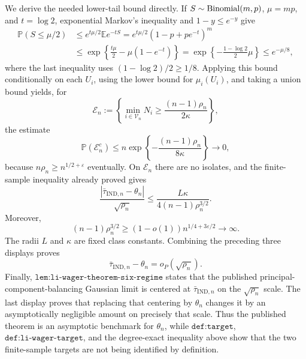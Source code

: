 We derive the needed lower-tail bound directly.  If \(S\sim{\rm Binomial}(m,p)\), \(\mu=mp\), and \(t=\log2\), exponential Markov's inequality and \(1-y\le e^{-y}\) give
\[
\begin{aligned}
\mathbb P(S\le\mu/2)
&\le e^{t\mu/2}\mathbb E e^{-tS}
=e^{t\mu/2}(1-p+pe^{-t})^m\\
&\le\exp\!\left\{\frac{t\mu}{2}-\mu(1-e^{-t})\right\}
=\exp\!\left\{-\frac{1-\log2}{2}\mu\right\}
\le e^{-\mu/8},
\end{aligned}
\]
where the last inequality uses \((1-\log2)/2\ge1/8\).  Applying this bound conditionally on each \(U_i\), using the lower bound for \(\mu_i(U_i)\), and taking a union bound yields, for
\[
\mathcal E_n
:=\left\{\min_{i\in\mathcal V_n}N_i\ge\frac{(n-1)\rho_n}{2\kappa}\right\},
\]
the estimate
\[
\mathbb P(\mathcal E_n^c)
\le n\exp\!\left\{-\frac{(n-1)\rho_n}{8\kappa}\right\}
\longrightarrow0,
\]
because \(n\rho_n\ge n^{1/2+\varepsilon}\) eventually.  On \(\mathcal E_n\) there are no isolates, and the finite-sample inequality already proved gives
\[
\frac{|\bar\tau_{\mathrm{IND},n}-\theta_n|}{\sqrt{\rho_n}}
\le\frac{L\kappa}{4(n-1)\rho_n^{3/2}}.
\]
Moreover,
\[
(n-1)\rho_n^{3/2}
\ge(1-o(1))n^{1/4+3\varepsilon/2}
\longrightarrow\infty.
\]
The radii \(L\) and \(\kappa\) are fixed class constants.  Combining the preceding three displays proves
\[
\bar\tau_{\mathrm{IND},n}-\theta_n=o_P(\sqrt{\rho_n}).
\]
Finally, \(\texttt{lem:li-wager-theorem-six-regime}\) states that the published principal-component-balancing Gaussian limit is centered at \(\bar\tau_{\mathrm{IND},n}\) on the \(\sqrt{\rho_n}\) scale.  The last display proves that replacing that centering by \(\theta_n\) changes it by an asymptotically negligible amount on precisely that scale.  Thus the published theorem is an asymptotic benchmark for \(\theta_n\), while \(\texttt{def:target}\), \(\texttt{def:li-wager-target}\), and the degree-exact inequality above show that the two finite-sample targets are not being identified by definition.